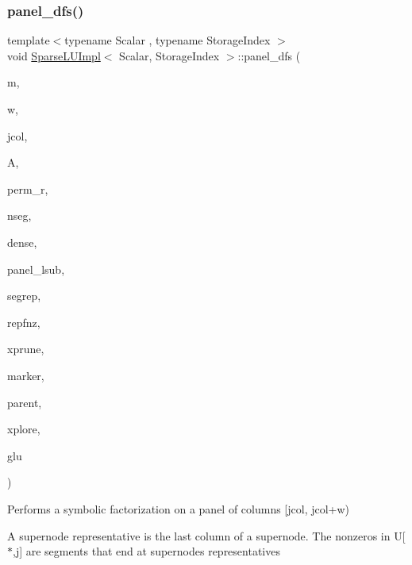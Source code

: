 \subsubsection{\texorpdfstring{panel\_dfs()}{panel\_dfs()}}
{\footnotesize\ttfamily template$<$typename Scalar , typename Storage\+Index $>$ \\
void \mbox{\hyperlink{class_eigen_1_1internal_1_1_sparse_l_u_impl}{Sparse\+L\+U\+Impl}}$<$ Scalar, Storage\+Index $>$\+::panel\+\_\+dfs (\begin{DoxyParamCaption}\item[{const Index}]{m,  }\item[{const Index}]{w,  }\item[{const Index}]{jcol,  }\item[{\mbox{\hyperlink{class_eigen_1_1_sparse_matrix}{Matrix\+Type}} \&}]{A,  }\item[{\mbox{\hyperlink{class_eigen_1_1_matrix}{Index\+Vector}} \&}]{perm\+\_\+r,  }\item[{Index \&}]{nseg,  }\item[{\mbox{\hyperlink{class_eigen_1_1_matrix}{Scalar\+Vector}} \&}]{dense,  }\item[{\mbox{\hyperlink{class_eigen_1_1_matrix}{Index\+Vector}} \&}]{panel\+\_\+lsub,  }\item[{\mbox{\hyperlink{class_eigen_1_1_matrix}{Index\+Vector}} \&}]{segrep,  }\item[{\mbox{\hyperlink{class_eigen_1_1_matrix}{Index\+Vector}} \&}]{repfnz,  }\item[{\mbox{\hyperlink{class_eigen_1_1_matrix}{Index\+Vector}} \&}]{xprune,  }\item[{\mbox{\hyperlink{class_eigen_1_1_matrix}{Index\+Vector}} \&}]{marker,  }\item[{\mbox{\hyperlink{class_eigen_1_1_matrix}{Index\+Vector}} \&}]{parent,  }\item[{\mbox{\hyperlink{class_eigen_1_1_matrix}{Index\+Vector}} \&}]{xplore,  }\item[{\mbox{\hyperlink{struct_eigen_1_1internal_1_1_l_u___global_l_u__t}{Global\+L\+U\+\_\+t}} \&}]{glu }\end{DoxyParamCaption})\hspace{0.3cm}{\ttfamily [protected]}}



Performs a symbolic factorization on a panel of columns \mbox{[}jcol, jcol+w) 

A supernode representative is the last column of a supernode. The nonzeros in U\mbox{[}$\ast$,j\mbox{]} are segments that end at supernodes representatives

